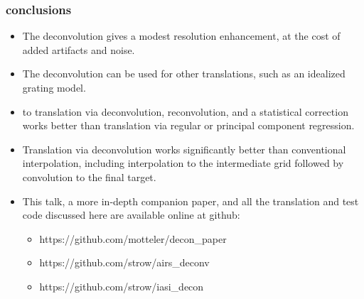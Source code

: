 \documentclass[10pt]{beamer}
\begin{document}
\begin{frame}
\frametitle{conclusions}
\begin{itemize}

  \item The {\airs} deconvolution gives a modest resolution
    enhancement, at the cost of added artifacts and noise.

  \item The deconvolution can be used for other translations, such
    as an idealized grating model.

  \item {\airs} to {\cris} translation via deconvolution,
    reconvolution, and a statistical correction works better than
    translation via regular or principal component regression.

  \item Translation via deconvolution works significantly better
    than conventional interpolation, including interpolation to the
    intermediate grid followed by convolution to the final target.

  \item This talk, a more in-depth companion paper, and all the
    translation and test code discussed here are available online at
    github:
    \begin{itemize}
      \item https://github.com/motteler/decon\_paper
      \item https://github.com/strow/airs\_deconv
      \item https://github.com/strow/iasi\_decon
    \end{itemize}

\end{itemize}
\end{frame}
\end{document}
